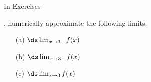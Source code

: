 {\noindent In Exercises}
{, numerically approximate the following limits:
	\begin{enumerate}
	\item[(a)]		$\ds \lim_{x\to 3^-} f(x)$
	\item[(b)]		$\ds \lim_{x\to 3^-} f(x)$
	\item[(c)]		$\ds \lim_{x\to 3} f(x)$
	\end{enumerate}
}
